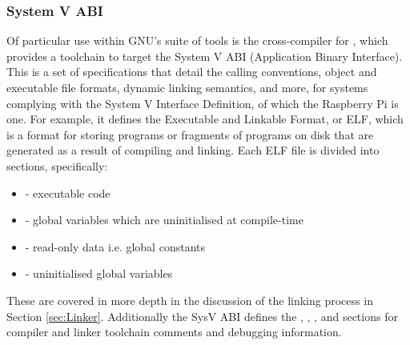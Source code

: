     \subsubsection{System V ABI}
        Of particular use within GNU's suite of tools is the cross-compiler for
        , which provides a toolchain to target the System V
        ABI (Application Binary Interface). This is a set of specifications that
        detail the calling conventions, object and executable file formats,
        dynamic linking semantics, and more, for systems complying with the
        System V Interface Definition, of which the Raspberry Pi is one. For
        example, it defines the Executable and Linkable Format, or ELF, which is
        a format for storing programs or fragments of programs on disk that are
        generated as a result of compiling and linking. Each ELF file is divided
        into sections, specifically:
        \begin{itemize}
            \label{list:LinkerSections}
            \itemsep0em
            \item {} - executable code
            \item {} - global variables which are uninitialised at
                compile-time
            \item {} - read-only data i.e. global constants
            \item {} - uninitialised global variables
        \end{itemize}

        These are covered in more depth in the discussion of the linking process
        in Section \ref{sec:Linker}. Additionally the SysV ABI defines the
        , , , and 
        sections for compiler and linker toolchain comments and debugging
        information.

